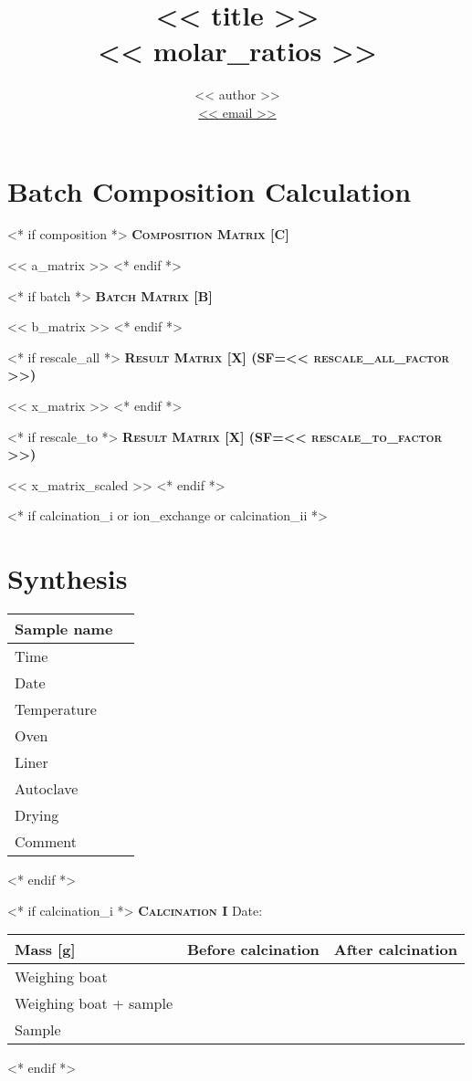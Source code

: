 \documentclass[10pt,a4paper]{article}
\title{<< title >> \\ {\large \normalfont << molar_ratios >>}}
\author{ << author >> \\
\href{mailto: << email >>}{{\color{bl}<< email >>}}\\}
\makeatletter
\newcommand{\subsecwithdate}[1]{{\color{bl}\scshape\bfseries\large {#1} }\hfill %
{\color{bl} Date: \Ovalbox{ \begin{minipage}{1.2in} \hfill\vspace{10pt} \end{minipage} }} \par}
\newcommand{\subsecwodate}[1]{{\color{bl}\scshape\bfseries\large {#1} } \par }
\def\printtitle{%
    {\color{bl} \centering \huge \sc \textbf{\@title}\par}}		%
\def\printauthor{%
    {\centering \small \@author}}				%
\makeatother
\begin{document}
\printtitle

\printauthor

\section{Batch Composition Calculation}
<* if composition *>
\subsecwodate{Composition Matrix [C]}
<< a_matrix >>
<* endif *>

<* if batch *>
\subsecwodate{Batch Matrix [B]}
<< b_matrix >>
<* endif *>

<* if rescale_all *>
\subsecwodate{Result Matrix [X] (SF=<< rescale_all_factor >>)}
<< x_matrix >>
<* endif *>

<* if rescale_to *>
\subsecwodate{Result Matrix [X] (SF=<< rescale_to_factor >>)}
<< x_matrix_scaled >>
<* endif *>


<* if calcination_i or ion_exchange or calcination_ii *>
\newpage
\section{Synthesis}
\begin{center}
\begin{tabularx}{\textwidth}{l|C}
\toprule
Sample name & \\
\midrule
Time & \\ 
Date & \\ 
Temperature & \\ 
Oven & \\ 
Liner & \\ 
Autoclave & \\ 
Drying & \\ 
Comment & \\
\bottomrule
\end{tabularx}
\end{center}
<* endif *>

<* if calcination_i *>
\subsecwithdate{Calcination I}
\begin{center}
\begin{tabularx}{\textwidth}{l|C|C}
\toprule
Mass [g] & Before calcination & After calcination \\
\midrule
Weighing boat & & \\ 
Weighing boat + sample & & \\ 
Sample & & \\
\bottomrule
\end{tabularx}
\end{center}
<* endif *>
\end{document}

